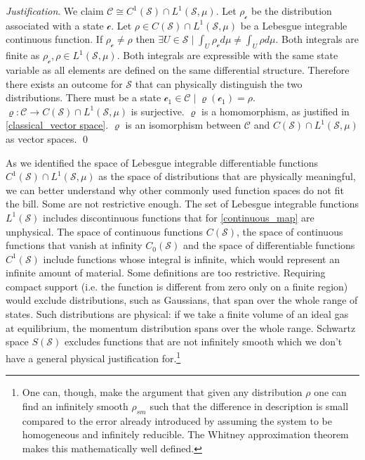 \documentclass[aps,pra,10pt,twocolumn,floatfix,nofootinbib]{revtex4-1}
\numberwithin{equation}{section}
\theoremstyle{definition}
\newenvironment{justification}{\emph{Justification}.}{\qed}
\begin{document}
\begin{justification}
	We claim $\mathcal{C} \cong C^1(\mathcal{S}) \cap L^1(\mathcal{S}, \mu)$. Let $\rho_\mathcal{c}$ be the distribution associated with a state $\mathcal{c}$. Let $\rho \in C(\mathcal{S}) \cap  L^1(\mathcal{S}, \mu)$ be a Lebesgue integrable continuous function. If $\rho_\mathcal{c} \neq \rho$ then $\exists U \in \mathcal{S} \; | \; \int_{U} \rho_\mathcal{c} d \mu \neq \int_{U} \rho d \mu$. Both integrals are finite as $\rho_\mathcal{c}, \rho \in L^1(\mathcal{S}, \mu)$. Both integrals are expressible with the same state variable as all elements are defined on the same differential structure. Therefore there exists an outcome for $\mathcal{S}$ that can physically distinguish the two distributions. There must be a state $\mathcal{c}_1 \in \mathcal{C} \; | \; \varrho(\mathcal{c}_1)=\rho$. $\varrho : \mathcal{C} \rightarrow C(\mathcal{S}) \cap  L^1(\mathcal{S}, \mu)$ is surjective. $\varrho$ is a homomorphism, as justified in \ref{classical_vector space}. $\varrho$ is an isomorphism between $\mathcal{C}$ and $C(\mathcal{S}) \cap  L^1(\mathcal{S}, \mu)$ as vector spaces.
\end{justification}

As we identified the space of Lebesgue integrable differentiable functions $C^1(\mathcal{S}) \cap  L^1(\mathcal{S}, \mu)$ as the space of distributions that are physically meaningful, we can better understand why other commonly used function spaces do not fit the bill. Some are not restrictive enough. The set of Lebesgue integrable functions $L^1(\mathcal{S})$ includes discontinuous functions that for \ref{continuous_map} are unphysical. The space of continuous functions $C(\mathcal{S})$, the space of continuous functions that vanish at infinity $C_0(\mathcal{S})$ and the space of differentiable functions $C^1(\mathcal{S})$ include functions whose integral is infinite, which would represent an infinite amount of material. Some definitions are too restrictive. Requiring compact support (i.e. the function is different from zero only on a finite region) would exclude distributions, such as Gaussians, that span over the whole range of states. Such distributions are physical: if we take a finite volume of an ideal gas at equilibrium, the momentum distribution spans over the whole range. Schwartz space $S(\mathcal{S})$ excludes functions that are not infinitely smooth which we don't have a general physical justification for.\footnote{One can, though, make the argument that given any distribution $\rho$ one can find an infinitely smooth $\rho_{sm}$ such that the difference in description is small compared to the error already introduced by assuming the system to be homogeneous and infinitely reducible. The Whitney approximation theorem makes this mathematically well defined.}
\end{document}
